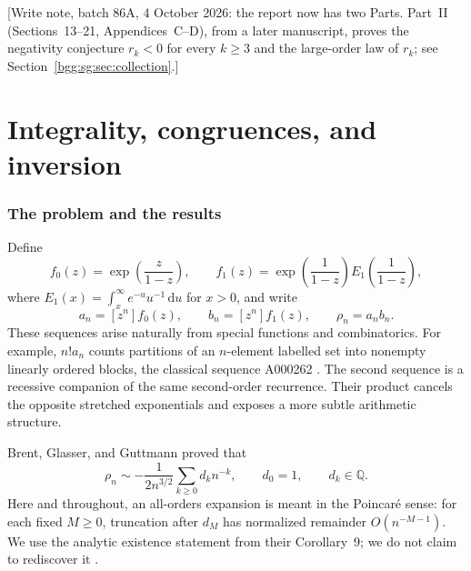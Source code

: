 \documentclass[11pt,a4paper]{article}
\numberwithin{equation}{section}
\theoremstyle{definition}
\theoremstyle{remark}
\theoremstyle{definition}
\newcommand{\Q}{\mathbb Q}
\newcommand{\dif}{\,\mathrm d}
\begin{document}
\begin{titlepage}

[Write note, batch 86A, 4 October 2026: the report now has two Parts.
Part~II (Sections~13--21, Appendices~C--D), from a later manuscript,
proves the negativity conjecture $r_k<0$ for every $k\ge3$ and the
large-order law of $r_k$; see Section~\ref{bgg:sg:sec:collection}.]
\end{titlepage}
\hypersetup{pageanchor=true}

\tableofcontents
\newpage

\part{Integrality, congruences, and inversion}
\label{bgg:part:arithmetic}

\section{The problem and the results}
\label{bgg:sec:introduction}

Define
\begin{equation}\label{bgg:eq:generating-functions}
 f_0(z)=\exp\!\left(\frac{z}{1-z}\right),\qquad
 f_1(z)=\exp\!\left(\frac1{1-z}\right)E_1\!\left(\frac1{1-z}\right),
\end{equation}
where $E_1(x)=\int_x^\infty e^{-u}u^{-1}\dif u$ for $x>0$, and write
\[
 a_n=[z^n]f_0(z),\qquad b_n=[z^n]f_1(z),\qquad \rho_n=a_nb_n.
\]
These sequences arise naturally from special functions and combinatorics.
For example, $n!a_n$ counts partitions of an $n$-element labelled set into
nonempty linearly ordered blocks, the classical sequence A000262
\cite{oeis262}. The second sequence is a recessive companion of the same
second-order recurrence. Their product cancels the opposite stretched
exponentials and exposes a more subtle arithmetic structure.

Brent, Glasser, and Guttmann proved that
\begin{equation}\label{bgg:eq:known-asymptotics}
 \rho_n\sim-\frac1{2n^{3/2}}\sum_{k\ge0}d_kn^{-k},\qquad d_0=1,
 \qquad d_k\in\Q.
\end{equation}
Here and throughout, an all-orders expansion is meant in the Poincar\'e sense:
for each fixed $M\ge0$, truncation after $d_M$ has normalized remainder
$O(n^{-M-1})$. We use the analytic existence statement from their Corollary~9;
we do not claim to rediscover it \cite{BGG}.
\end{document}
